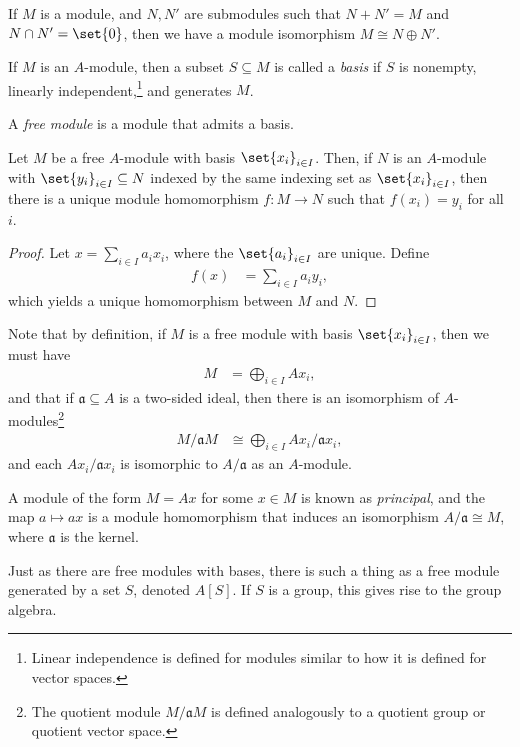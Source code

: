 \documentclass[10pt]{mypackage}
\begin{document}
If $M$ is a module, and $N,N'$ are submodules such that $N + N' = M$ and $N\cap N' = \set{0}$, then we have a module isomorphism $M\cong N\oplus N'$.
\begin{definition}
  If $M$ is an $A$-module, then a subset $S\subseteq M$ is called a \textit{basis} if $S$ is nonempty, linearly independent,\footnote{Linear independence is defined for modules similar to how it is defined for vector spaces.} and generates $M$.\newline

  A \textit{free module} is a module that admits a basis.
\end{definition}
\begin{theorem}
  Let $M$ be a free $A$-module with basis $\set{x_i}_{i\in I}$. Then, if $N$ is an $A$-module with $\set{y_i}_{i\in I}\subseteq N$ indexed by the same indexing set as $\set{x_i}_{i\in I}$, then there is a unique module homomorphism $f\colon M\rightarrow N$ such that $f\left( x_i \right) = y_i$ for all $i$.
\end{theorem}
\begin{proof}
  Let $x = \sum_{i\in I}a_ix_i$, where the $\set{a_i}_{i\in I}$ are unique. Define
  \begin{align*}
    f(x) &= \sum_{i\in I}a_iy_i,
  \end{align*}
  which yields a unique homomorphism between $M$ and $N$.
\end{proof}
Note that by definition, if $M$ is a free module with basis $\set{x_i}_{i\in I}$, then we must have
\begin{align*}
  M &= \bigoplus_{i\in I}Ax_i,
\end{align*}
and that if $\mathfrak{a}\subseteq A$ is a two-sided ideal, then there is an isomorphism of $A$-modules\footnote{The quotient module $M/\mathfrak{a}M$ is defined analogously to a quotient group or quotient vector space.}
\begin{align*}
  M/\mathfrak{a}M &\cong \bigoplus_{i\in I}Ax_i/\mathfrak{a}x_i,
\end{align*}
and each $Ax_i/\mathfrak{a}x_i$ is isomorphic to $A/\mathfrak{a}$ as an $A$-module.\newline

A module of the form $M = Ax$ for some $x\in M$ is known as \textit{principal}, and the map $a\mapsto ax$ is a module homomorphism that induces an isomorphism $A/\mathfrak{a} \cong M$, where $\mathfrak{a}$ is the kernel.\newline

Just as there are free modules with bases, there is such a thing as a free module generated by a set $S$, denoted $A\left[ S \right]$. If $S$ is a group, this gives rise to the group algebra.
\end{document}
